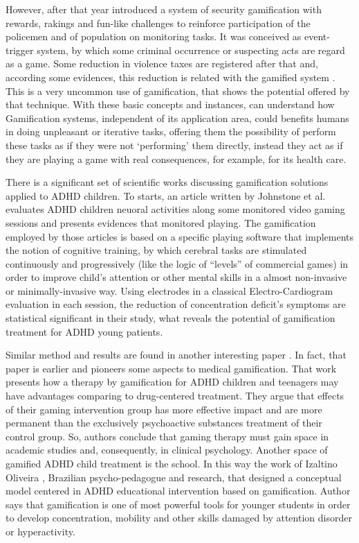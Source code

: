 However, after that year introduced a system of security gamification with rewards, rakings and fun-like challenges to reinforce participation of the policemen and of population on monitoring tasks. It was conceived as event-trigger system, by which some criminal occurrence or suspecting acts are regard as a game. Some reduction in violence taxes are registered after that and, according some evidences, this reduction is related with the gamified system \citep{conf/cts/Aud13}. This is a very uncommon use of gamification, that shows the potential offered by that technique. With these basic concepts and instances,  can understand how Gamification systems, independent of its application area, could benefits humans in doing unpleasant or iterative tasks, offering them the possibility of perform these tasks as if they were not `performing' them directly, instead they act as if they are playing a game with real consequences, for example, for its health care.

There is a significant set of scientific works discussing gamification solutions applied to ADHD children. To starts, an article written by Johnstone et al. \citep{Johnstone-2013} evaluates ADHD children neuoral activities along some monitored video gaming sessions and presents evidences that monitored playing. The gamification employed by those articles is based on a specific playing software  that implements the notion of cognitive training, by which cerebral tasks are stimulated continuously and progressively (like the logic of ``levels'' of commercial games) in order to improve child's attention or other mental skills in a almost non-invasive or minimally-invasive way.  Using electrodes in a classical Electro-Cardiogram evaluation in each session, the reduction of concentration deficit's symptoms are statistical significant in their study, what reveals the potential of gamification treatment for ADHD young patients.

Similar method and results are found in another interesting paper \citep{Nemeth}. In fact, that paper is earlier and pioneers some aspects to medical gamification. That work  presents how a therapy by gamification for ADHD children and teenagers may have advantages comparing to drug-centered treatment. They argue that effects of their gaming intervention group has more effective impact and are more permanent than the exclusively psychoactive substances treatment of their control group. So, authors conclude that gaming therapy must gain space in academic studies and, consequently, in clinical psychology. Another space of gamified ADHD child treatment is the school. In this way the work of Izaltino Oliveira \citep{Oliveira}, Brazilian psycho-pedagogue and research, that designed a conceptual model centered in ADHD educational intervention based on gamification. Author says that gamification is one of most powerful tools for younger students in order to develop concentration, mobility and other skills damaged by attention disorder or hyperactivity.

